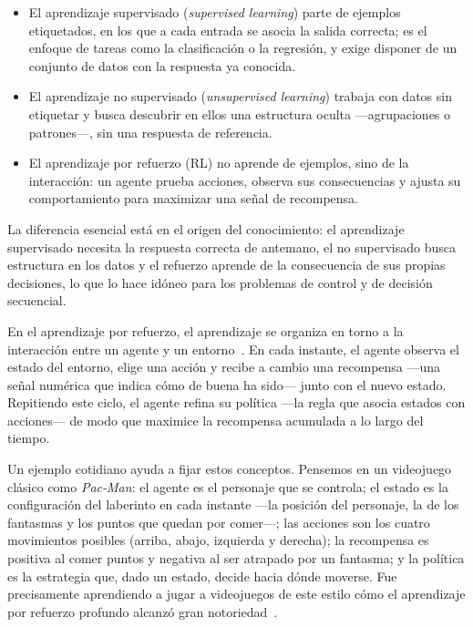 {\begin{itemize}
  \item El aprendizaje supervisado (\textit{supervised learning}) parte de ejemplos etiquetados, en los que a cada entrada se asocia la salida correcta; es el enfoque de tareas como la clasificación o la regresión, y exige disponer de un conjunto de datos con la respuesta ya conocida.
  \item El aprendizaje no supervisado (\textit{unsupervised learning}) trabaja con datos sin etiquetar y busca descubrir en ellos una estructura oculta ---agrupaciones o patrones---, sin una respuesta de referencia.
  \item El aprendizaje por refuerzo (\gls{RL}) no aprende de ejemplos, sino de la interacción: un agente prueba acciones, observa sus consecuencias y ajusta su comportamiento para maximizar una señal de recompensa.
\end{itemize}

La diferencia esencial está en el origen del conocimiento: el  aprendizaje supervisado necesita la respuesta correcta de antemano, el no supervisado busca estructura en los datos y el refuerzo aprende de la consecuencia de sus propias decisiones, lo que lo hace idóneo para los problemas de control y de decisión secuencial.

En el aprendizaje por refuerzo, el aprendizaje se organiza en torno a la interacción entre un agente y un entorno~\cite{suttonbarto2018}. En cada instante, el agente observa el estado del entorno, elige una acción y recibe a cambio una recompensa ---una señal numérica que indica cómo de buena ha sido--- junto con el nuevo estado. Repitiendo este ciclo, el agente refina su política ---la regla que asocia estados con acciones--- de modo que maximice la recompensa acumulada a lo largo del tiempo.

Un ejemplo cotidiano ayuda a fijar estos conceptos. Pensemos en un videojuego clásico como \textit{Pac-Man}: el agente es el personaje que se controla; el estado es la configuración del laberinto en cada instante ---la posición del personaje, la de los fantasmas y los puntos que quedan por comer---; las acciones son los cuatro movimientos posibles (arriba, abajo, izquierda y derecha); la recompensa es positiva al comer puntos y negativa al ser atrapado por un fantasma; y la política es la estrategia que, dado un estado, decide hacia dónde moverse. Fue precisamente aprendiendo a jugar a videojuegos de este estilo cómo el aprendizaje por refuerzo profundo alcanzó gran notoriedad~\cite{mnih2015}.

}
